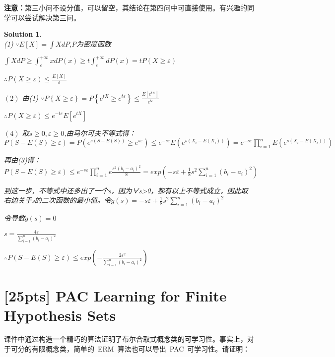 \documentclass[a4paper,UTF8]{article}
\numberwithin{equation}{section}
\newtheorem*{mySol}{Solution}
\begin{document}
	\textbf{注意：}第三小问不设分值，可以留空，其结论在第四问中可直接使用。有兴趣的同学可以尝试解决第三问。
\begin{mySol}~\\
(1)
$\because E\left [ X \right ] = \int XdP
$,P为密度函数

$\int XdP\geq \int_{\varepsilon }^{+\infty}x dP(x)\geq t\int_{\varepsilon }^{+\infty}dP(x)=tP\left ( X\geq \varepsilon  \right )
$

$ \therefore P\left ( X\geq \varepsilon  \right )\leq \frac{E\left [ X \right ]}{\varepsilon }$


\noindent$\displaystyle(2)$
由(1)
$\because P\left\{ X\geq \varepsilon \right\} = P\left\{ e^{tX}\geq  e^{t\varepsilon }\right\} \leq \frac{E\left [ e^{tX} \right ]}{e^{t\varepsilon }}$

$\therefore P\left ( X\geq \varepsilon  \right ) \leq e^{-t\varepsilon }E\left [ e^{tX} \right ]$


\noindent$\displaystyle(4)$
取$s\geq 0,\varepsilon \geq 0$,由马尔可夫不等式得：
$P\left ( S-E\left ( S \right )\geq \varepsilon  \right )=P\left ( e^{s\left ( S-E\left ( S \right ) \right )}\geq e^{s\varepsilon } \right )\leq e^{-s\varepsilon }E\left ( e^{s\left ( X_{i}-E\left ( X_{i} \right ) \right )} \right )= e^{-s\varepsilon }\prod_{i=1}^{n}E\left ( e^{s\left ( X_{i}-E\left ( X_{i} \right ) \right )} \right )$

再由(3)得：$ P\left ( S-E\left ( S \right )\geq \varepsilon  \right )\leq e^{-s\varepsilon }\prod_{i=1}^{n}e\frac{s^{2}\left ( b_{i}-a_{i} \right )^{2}}{8} = exp(-s\varepsilon +\frac{1}{8}s^{2}\sum_{i=1}^{n}\left ( b_{i}-a_{i} \right )^{2})$

到这一步，不等式中还多出了一个s，因为∀s>0，都有以上不等式成立，因此取右边关于s的二次函数的最小值。令$g\left ( s \right ) = -s\varepsilon +\frac{1}{8}s^{2}\sum_{i=1}^{n}\left ( b_{i}-a_{i} \right )^{2}$

令导数$\dot g(s) = 0 $

$s=\frac{4\varepsilon }{\sum_{i=1}^{n}\left ( b_{i}-a_{i} \right )^{2}}$

$\therefore  P\left ( S-E\left ( S \right ) \geq \varepsilon \right )\leq exp\left ( -\frac{2\varepsilon ^{2}}{\sum_{i=1}^{n}\left ( b_{i}-a_{i} \right )^{2}} \right )$






\end{mySol}
\newpage


\section{[25pts] PAC Learning for Finite Hypothesis Sets}
课件中通过构造一个精巧的算法证明了布尔合取式概念类的可学习性。事实上，对于可分的有限概念类，简单的~ERM~算法也可以导出~PAC~可学习性。请证明：
\end{document}
